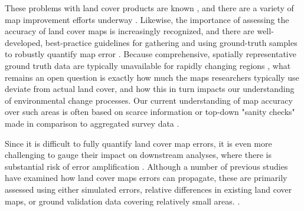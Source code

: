 \documentclass[a4paper]{article}
\begin{document}
These problems with land cover products are known \citep{fritz_comparison_2010, fritz_cropland_2011, see_improved_2015, fritz_mapping_2015,verburg_challenges_2011}, and there are a variety of map improvement efforts underway \citep[e.g.][]{fritz_geo-wiki:_2012, estes_platform_2016}. Likewise, the importance of assessing the accuracy of land cover maps is increasingly recognized, and there are well-developed, best-practice guidelines for gathering and using ground-truth samples to robustly quantify map error \citep{foody_status_2002,olofsson_making_2013,olofsson_good_2014,stehman_global_2012}. Because comprehensive, spatially representative ground truth data are typically unavailable for rapidly changing regions \citep{see_improved_2015,kuemmerle_challenges_2013}, what remains an open question is exactly how much the maps researchers typically use deviate from actual land cover, and how this in turn impacts our understanding of environmental change processes.  Our current understanding of map accuracy over such areas is often based on scarce information or top-down "sanity checks" made in comparison to aggregated survey data \citep{yu_meta-discoveries_2014,larsen_taken_2015}.  


Since it is difficult to fully quantify land cover map errors, it is even more challenging to gauge their impact on downstream analyses, where there is substantial risk of error amplification \citep{kuemmerle_challenges_2013}. Although a number of previous studies have examined how land cover maps errors can propagate, these are primarily assessed using either simulated errors, relative differences in existing land cover maps, or ground validation data covering relatively small areas. \citep[e.g.][]{ge_impacts_2007, linard_assessing_2010, quaife_impact_2008,tuanmu_global_2014,schmit_limitations_2006}. 

\end{document}
